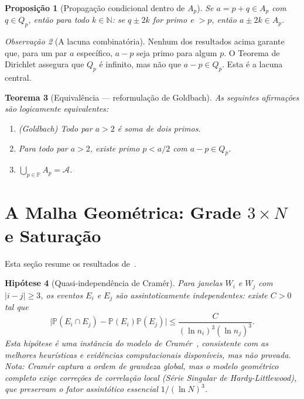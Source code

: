 \documentclass[12pt,a4paper]{article}
\newtheorem{theorem}{Teorema}[section]
\newtheorem{proposition}[theorem]{Proposi\c{c}\~ao}
\newtheorem{hypothesis}[theorem]{Hip\'otese}
\theoremstyle{remark}
\newtheorem{remark}[theorem]{Observa\c{c}\~ao}
\newcommand{\calA}{\mathcal{A}}
\newcommand{\NN}{\mathbb{N}}
\newcommand{\bP}{\mathbb{P}}
\begin{document}
	\begin{proposition}[Propagação condicional dentro de $A_p$]
		Se $a = p+q \in A_p$ com $q\in Q_p$, ent\~ao para todo $k\in\NN$: se $q\pm 2k$
		for primo e $> p$, ent\~ao $a\pm 2k\in A_p$.
	\end{proposition}
	
	\begin{remark}[A lacuna combinatória]
		\label{rem:lacuna-comb}
		Nenhum dos resultados acima garante que, para um par $a$ espec\'ifico,
		$a-p$ seja primo para algum $p$.  O Teorema de Dirichlet assegura que $Q_p$ \'e
		infinito, mas n\~ao que $a-p\in Q_p$.  Esta \'e a lacuna central.
	\end{remark}
	
	\begin{theorem}[Equivalência --- reformulação de Goldbach]
		\label{thm:equiv}
		As seguintes afirma\c{c}\~oes s\~ao logicamente equivalentes:
		\begin{enumerate}[\normalfont(i)]
			\item \emph{(Goldbach)} Todo par $a>2$ \'e soma de dois primos.
			\item Para todo par $a>2$, existe primo $p<a/2$ com $a-p\in Q_p$.
			\item $\bigcup_{p\in\bP} A_p = \calA$.
		\end{enumerate}
	\end{theorem}
	
	\section{A Malha Geom\'etrica: Grade $3\times N$ e Satura\c{c}\~ao}
	
	Esta se\c{c}\~ao resume os resultados de~\cite{bandeira2026geometrica}.
	
	\begin{hypothesis}[Quasi-independência de Cramér]
		Para janelas $W_i$ e $W_j$ com $|i-j|\geq 3$, os eventos $E_i$ e $E_j$ s\~ao
		assintoticamente independentes: existe $C>0$ tal que
		\[
		\bigl|\bP(E_i\cap E_j) - \bP(E_i)\bP(E_j)\bigr|
		\leq \frac{C}{(\ln n_i)^3(\ln n_j)^3}.
		\]
		Esta hip\'otese \'e uma inst\^ancia do modelo de Cram\'er~\cite{cramer1936},
		consistente com as melhores heur\'isticas e evid\^encias computacionais dispon\'iveis,
		mas n\~ao provada. Nota: Cramér captura a ordem de grandeza global, mas o modelo geométrico completo exige correções de correlação local (Série Singular de Hardy-Littlewood), que preservam o fator assintótico essencial $1/(\ln N)^3$.
	\end{hypothesis}
	
\end{document}
